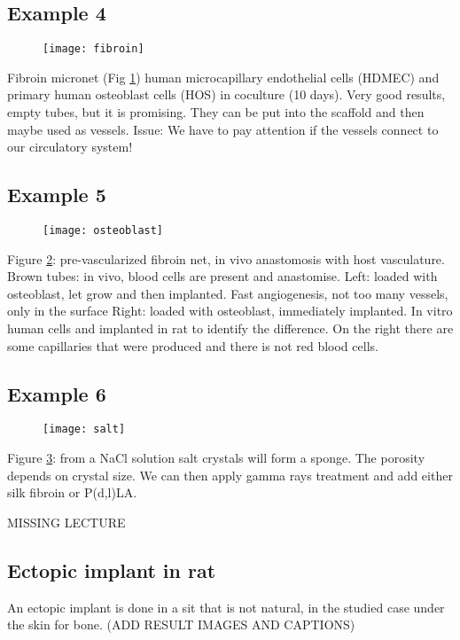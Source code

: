 \subsection{Example 4}
\begin{figure}[h]
\centering
\texttt{[image: fibroin]}
\caption{\label{fig:fibroin}}
\end{figure}
Fibroin micronet (Fig \ref{fig:fibroin}) human microcapillary endothelial cells (HDMEC) and primary human osteoblast cells (HOS) in coculture (10 days). Very good results, empty tubes, but it is promising. They can be put into the scaffold and then maybe used as vessels. Issue: We have to pay attention if the vessels connect to our circulatory system!

\subsection{Example 5}
\begin{figure}[h]
\centering
\texttt{[image: osteoblast]}
\caption{\label{fig:osteoblast}}
\end{figure}
Figure \ref{fig:osteoblast}: pre-vascularized fibroin net, in vivo anastomosis with host vasculature.
Brown tubes: in vivo, blood cells are present and anastomise. 
Left: loaded with osteoblast, let grow and then implanted. Fast angiogenesis, not too many vessels, only in the surface
Right: loaded with osteoblast, immediately implanted.
In vitro human cells and implanted in rat to identify the difference. On the right there are some capillaries that were produced and there is not red blood cells.

\subsection{Example 6}
\begin{figure}[h]
\centering
\texttt{[image: salt]}
\caption{\label{fig:salt}}
\end{figure}
Figure \ref{fig:salt}: from a NaCl solution salt crystals will form a sponge. The porosity depends on crystal size. We can then apply gamma rays treatment and add either silk fibroin or P(d,l)LA.

MISSING LECTURE

    \subsection{Ectopic implant in rat}
    An ectopic implant is done in a sit that is not natural, in the studied case under the skin for bone.
    (ADD RESULT IMAGES AND CAPTIONS)

